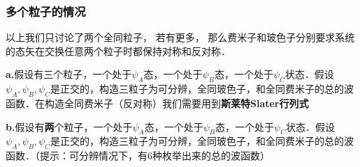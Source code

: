 \subsubsection{多个粒子的情况}
以上我们只讨论了两个全同粒子， 若有更多， 那么费米子和玻色子分别要求系统的态矢在交换任意两个粒子时都保持对称和反对称．
\begin{exercise}{}
\textbf{a.}假设有三个粒子，一个处于$\psi_A$态，一个处于$\psi_B$态，一个处于$\psi_C$状态．假设$\psi_A,\psi_B,\psi_C$是正交的，构造三粒子为可分辨，全同玻色子，和全同费米子的总的波函数．在构造全同费米子（反对称）我们需要用到\textbf{斯莱特Slater行列式}

\textbf{b.}假设有\textbf{两}个粒子，一个处于$\psi_A$态，一个处于$\psi_B$态，一个处于$\psi_C$状态．假设$\psi_A,\psi_B,\psi_C$是正交的，构造三粒子为可分辨，全同玻色子，和全同费米子的总的波函数．（提示：可分辨情况下，有$6$种枚举出来的总的波函数）
\end{exercise}
